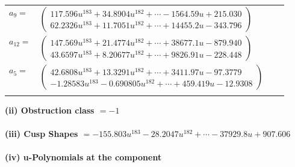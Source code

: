 \documentclass[1p]{elsarticle_modified}
\theoremstyle{definition}
\begin{document}
\begin{tabular}{m{7pt} m{180pt} m{7pt} m{180pt} }
\flushright $a_{9}=$&$\begin{pmatrix}117.596 u^{183}+34.8904 u^{182}+\cdots-1564.59 u+215.030\\62.2326 u^{183}+11.7051 u^{182}+\cdots+14455.2 u-343.796\end{pmatrix}$ \\
\flushright $a_{12}=$&$\begin{pmatrix}147.569 u^{183}+21.4774 u^{182}+\cdots+38677.1 u-879.940\\43.6597 u^{183}+8.20677 u^{182}+\cdots+9826.91 u-228.448\end{pmatrix}$ \\
\flushright $a_{5}=$&$\begin{pmatrix}42.6808 u^{183}+13.3291 u^{182}+\cdots+3411.97 u-97.3779\\-1.28583 u^{183}-0.690805 u^{182}+\cdots+459.419 u-12.9308\end{pmatrix}$\\&\end{tabular}
\flushleft \textbf{(ii) Obstruction class $= -1$}\\~\\
\flushleft \textbf{(iii) Cusp Shapes $= -155.803 u^{183}-28.2047 u^{182}+\cdots-37929.8 u+907.606$}\\~\\
\newpage\renewcommand{\arraystretch}{1}
\flushleft \textbf{(iv) u-Polynomials at the component}\newline \\
\end{document}
